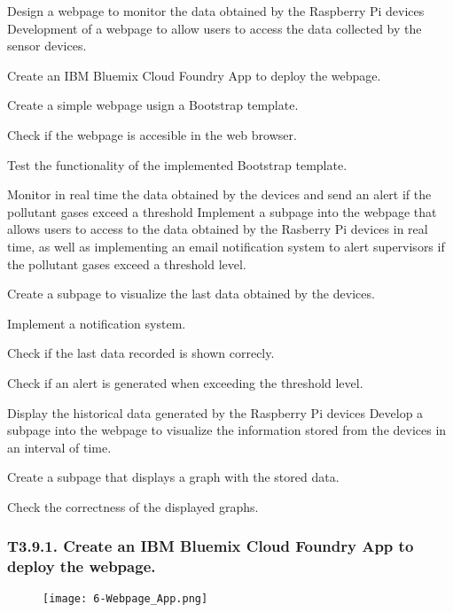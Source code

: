 {Design a webpage to monitor the data obtained by the Raspberry Pi devices}
{Development of a webpage to allow users to access the data collected by the sensor devices.}
{	\item Create an IBM Bluemix Cloud Foundry App to deploy the webpage.
	\item Create a simple webpage usign a Bootstrap template.
}{	\item Check if the webpage is accesible in the web browser.
	\item Test the functionality of the implemented Bootstrap template.
}

{Monitor in real time the data obtained by the devices and send an alert if the pollutant gases exceed a threshold}
{Implement a subpage into the webpage that allows users to access to the data obtained by the Rasberry Pi devices in real time, as well as implementing an email notification system to alert supervisors if the pollutant gases exceed a threshold level.}
{	\item Create a subpage to visualize the last data obtained by the devices.
	\item Implement a notification system.
}{	\item Check if the last data recorded is shown correcly.
	\item Check if an alert is generated when exceeding the threshold level.
}

{Display the historical data generated by the Raspberry Pi devices}
{Develop a subpage into the webpage to visualize the information stored from the devices in an interval of time.}
{	\item Create a subpage that displays a graph with the stored data.
}{	\item Check the correctness of the displayed graphs.
}




\subsubsection{T3.9.1. Create an IBM Bluemix Cloud Foundry App to deploy the webpage.}

\begin{figure}[!h]
	\begin{center}
		\texttt{[image: 6-Webpage\_App.png]}
		\caption{}
		\label{fig:6-Webpage_App}
	\end{center}
\end{figure}


